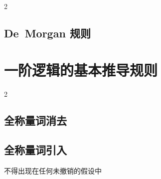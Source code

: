 \begin{multicols}{2}
\subsection*{De~Morgan 规则}
\begin{fitchproof}
\end{fitchproof}
\begin{fitchproof}
\end{fitchproof}
\begin{fitchproof}
\end{fitchproof}
\begin{fitchproof}
\end{fitchproof}
\end{multicols}


\section{一阶逻辑的基本推导规则}

\begin{multicols}{2}
\subsection*{全称量词消去}

\begin{fitchproof}
	 
\end{fitchproof}

\subsection*{全称量词引入}

\begin{fitchproof}
	 
\end{fitchproof}
\begin{raggedright}
 不得出现在任何未撤销的假设中
\end{raggedright}
\end{multicols}

